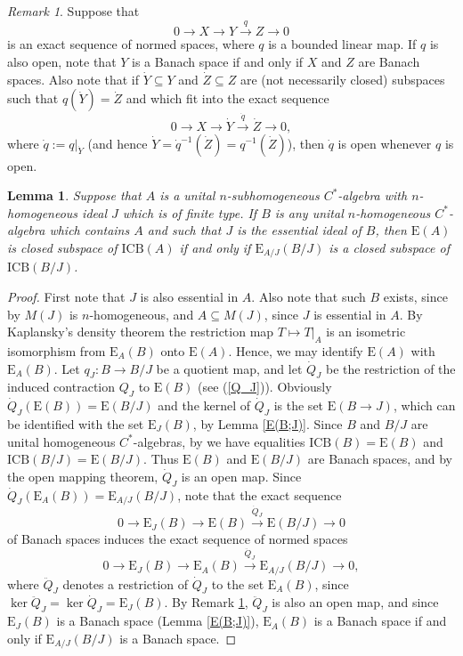 \documentclass[]{amsart}
\newtheorem{lemma}[theorem]{Lemma}
\theoremstyle{remark}
\newtheorem{remark}[theorem]{Remark}
\theoremstyle{definition}
\theoremstyle{question}
\numberwithin{equation}{section}
\begin{document}
\begin{remark}\label{exact} Suppose that $$0 \longrightarrow X \longrightarrow Y \stackrel{q}\longrightarrow Z \longrightarrow 0$$
is an exact sequence of normed spaces, where $q$ is a bounded linear map. If $q$ is also open, note that $Y$ is a Banach space if and only if $X$ and $Z$ are Banach spaces. Also note that if
$\dot{Y} \subseteq Y$ and $\dot{Z} \subseteq Z$  are (not necessarily closed) subspaces such that $q(\dot{Y})=\dot{Z}$ and which fit into the exact sequence
$$0 \longrightarrow X \longrightarrow \dot{Y} \stackrel{\dot{q}}\longrightarrow \dot{Z} \longrightarrow 0,$$
where $\dot{q}:=q|_{\dot{Y}}$ (and hence $\dot{Y}=\dot{q}^{-1}(\dot{Z})=q^{-1}(\dot{Z})$), then $\dot{q}$ is open whenever $q$ is open.
\end{remark}
\begin{lemma}\label{str} Suppose that $A$ is a unital $n$-subhomogeneous
$C^*$-algebra with $n$-homogeneous ideal $J$ which is of finite type. If $B$ is any unital $n$-homogeneous $C^*$-algebra
which contains $A$ and such that $J$ is the essential ideal of $B$, then ${\mathrm{E}}(A)$ is closed subspace of $\mathrm{ICB}(A)$ if and
only if ${\mathrm{E}}_{A/J}(B/J)$ is a closed subspace of $\mathrm{ICB}(B/J)$.
\end{lemma}
\begin{proof} First note that $J$ is also essential in $A$. Also note that such $B$ exists, since by \cite{Mag} $M(J)$ is
$n$-homogeneous, and $A \subseteq M(J)$, since $J$ is essential in $A$. By
Kaplansky's density theorem the restriction map $T \mapsto T|_A$  is an
isometric isomorphism from $\mathrm{E}_A(B)$ onto ${\mathrm{E}}(A)$. Hence, we may
identify ${\mathrm{E}}(A)$ with ${\mathrm{E}}_A(B)$. Let $q_J : B \to B/J$ be a quotient map, and
let $\dot{Q}_J$ be the restriction of the induced contraction $Q_J$ to ${\mathrm{E}}(B)$
(see (\ref{Q_J})). Obviously $\dot{Q}_J({\mathrm{E}}(B))={\mathrm{E}}(B/J)$ and the kernel of
$\dot{Q}_J$ is the set ${\mathrm{E}}(B\rightarrow J)$, which can be identified with the set ${\mathrm{E}}_J(B)$,
by Lemma \ref{E(B;J)}. Since $B$ and $B/J$ are unital
homogeneous $C^*$-algebras, by \cite[1.1]{Mag} we have equalities
$\mathrm{ICB}(B)={\mathrm{E}}(B)$ and $\mathrm{ICB}(B/J)={\mathrm{E}}(B/J)$. Thus ${\mathrm{E}}(B)$ and
${\mathrm{E}}(B/J)$ are Banach spaces, and by the open mapping theorem, $\dot{Q}_J$ is an
open map. Since $\dot{Q}_J({\mathrm{E}}_A(B))={\mathrm{E}}_{A/J}(B/J)$, note that the exact sequence
$$0 \longrightarrow {\mathrm{E}}_J(B) \longrightarrow {\mathrm{E}}(B)
\stackrel{\dot{Q}_J}\longrightarrow {\mathrm{E}}(B/J) \longrightarrow 0$$
of Banach spaces induces the exact sequence of normed spaces
 $$0 \longrightarrow {\mathrm{E}}_J(B) \longrightarrow {\mathrm{E}}_A(B)
\stackrel{\ddot{Q}_J}\longrightarrow {\mathrm{E}}_{A/J}(B/J) \longrightarrow 0,$$
where $\ddot{Q}_J$ denotes a restriction of $\dot{Q}_J$ to the set
${\mathrm{E}}_A(B)$, since $\ker \ddot{Q}_J = \ker \dot{Q}_J= {\mathrm{E}}_J(B)$. By Remark \ref{exact}, $\ddot{Q}_J$
is also an open map, and since ${\mathrm{E}}_J(B)$ is a Banach space (Lemma \ref{E(B;J)}), ${\mathrm{E}}_A(B)$ is a Banach space if and only if ${\mathrm{E}}_{A/J}(B/J)$
is a Banach space.
\end{proof}
\end{document}
